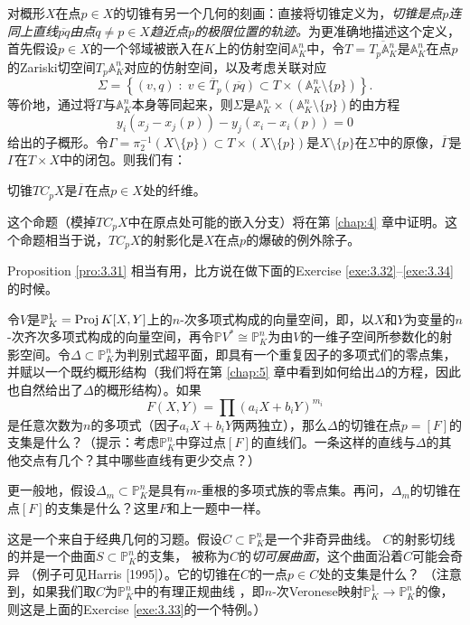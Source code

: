 对概形$X$在点$p\in X$的切锥有另一个几何的刻画：直接将切锥定义为，\textit{切锥是点$p$连同上直线$\overline{pq}$由点$q\neq p\in X$趋近点$p$的极限位置的轨迹。}为更准确地描述这个定义，首先假设$p\in X$的一个邻域被嵌入在$K$上的仿射空间$\mathbb A_K^n$中，令$T=\overline{T_p\mathbb A_K^n}$是$\mathbb A_K^n$在点$p$的Zariski切空间$T_p\mathbb A_K^n$对应的仿射空间，以及考虑关联对应
\[
	\Sigma = \left\{(v,q)\;:\;v\in \overline{T}_p(\overline{pq})\subset T\times (\mathbb A_K^n \setminus \{p\})\right\}.
\] %
等价地，通过将$T$与$\mathbb A_K^n$本身等同起来，则$\Sigma$是$\mathbb A_K^n\times (\mathbb A_K^n \setminus \{p\})$的由方程
\[
	y_i\left(x_j-x_j(p)\right)-y_j\left(x_i-x_i(p)\right)=0
\]
给出的子概形。令$\Gamma=\pi_2^{-1}(X\setminus \{p\})\subset T\times (X\setminus \{p\})$是$X\setminus \{p\}$在$\Sigma$中的原像，$\overline{\Gamma}$是$\Gamma$在$T\times X$中的闭包。则我们有：

\begin{pro}\label{pro:3.31}
切锥$TC_p X$是$\overline{\Gamma}$在点$p\in X$处的纤维。
\end{pro}

这个命题（模掉$TC_p X$中在原点处可能的嵌入分支）将在第 \ref{chap:4} 章中证明。这个命题相当于说，$TC_p X$的射影化是$X$在点$p$的爆破的例外除子。

Proposition \ref{pro:3.31} 相当有用，比方说在做下面的Exercise \ref{exe:3.32}--\ref{exe:3.34} 的时候。

\begin{exe}\label{exe:3.32}
令$V$是$\mathbb P_K^1=\operatorname{Proj} K[X,Y]$上的$n$-次多项式构成的向量空间，即，以$X$和$Y$为变量的$n$-次齐次多项式构成的向量空间，再令$\mathbb P V^*\cong \mathbb P_K^n$为由$V$的一维子空间所参数化的射影空间。令$\Delta\subset \mathbb P_K^n$为判别式超平面，即具有一个重复因子的多项式们的零点集，并赋以一个既约概形结构（我们将在第 \ref{chap:5} 章中看到如何给出$\Delta$的方程，因此也自然给出了$\Delta$的概形结构）。如果
\[
	F(X,Y)=\prod (a_i X+b_i Y)^{m_i}
\]
是任意次数为$n$的多项式（因子$a_iX+b_iY$两两独立），那么$\Delta$的切锥在点$p=[F]$的支集是什么？（提示：考虑$\mathbb P_K^n$中穿过点$[F]$的直线们。一条这样的直线与$\Delta$的其他交点有几个？其中哪些直线有更少交点？）
\end{exe}

\begin{exe}\label{exe:3.33}
更一般地，假设$\Delta_m\subset \mathbb P_K^n$是具有$m$-重根的多项式族的零点集。再问，$\Delta_m$的切锥在点$[F]$的支集是什么？这里$F$和上一题中一样。
\end{exe}

\begin{exe}\label{exe:3.34}
这是一个来自于经典几何的习题。假设$C\subset \mathbb P_K^n$是一个非奇异曲线。
$C$的射影切线的并是一个曲面$S\subset \mathbb P_K^n$的支集，
被称为$C$的\textit{切可展曲面}，这个曲面沿着$C$可能会奇异
（例子可见Harris [1995]）。它的切锥在$C$的一点$p\in C$处的支集是什么？
（注意到，如果我们取$C$为$\mathbb P_K^n$中的有理正规曲线%
，即$n$-次Veronese映射$\mathbb P_K^1\to\mathbb P_K^n$的像，则这是上面的Exercise \ref{exe:3.33}的一个特例。）
\end{exe}

